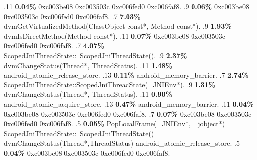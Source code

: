\begin{profile}
{.11 \textbf{0.04\%} 0xc003be08\newline {} 0xc003503c\newline {} 0xc006fed0\newline {} 0xc006faf8. 
.9 \textbf{0.06\%} 0xc003be08\newline {} 0xc003503c\newline {} 0xc006fed0\newline {} 0xc006faf8. 
.7 \textbf{7.03\%} dvmGetVirtualizedMethod(ClassObject const*, Method const*). 
.9 \textbf{1.93\%} dvmIsDirectMethod(Method const*). 
.11 \textbf{0.07\%} 0xc003be08\newline {} 0xc003503c\newline {} 0xc006fed0\newline {} 0xc006faf8. 
.7 \textbf{4.07\%} ScopedJniThreadState::~ScopedJniThreadState(). 
.9 \textbf{2.37\%} dvmChangeStatus(Thread*, ThreadStatus). 
.11 \textbf{1.48\%} android\_atomic\_release\_store. 
.13 \textbf{0.11\%} android\_memory\_barrier. 
.7 \textbf{2.74\%} ScopedJniThreadState::ScopedJniThreadState(\_JNIEnv*). 
.9 \textbf{1.31\%} dvmChangeStatus(Thread*, ThreadStatus). 
.11 \textbf{0.90\%} android\_atomic\_acquire\_store. 
.13 \textbf{0.47\%} android\_memory\_barrier. 
.11 \textbf{0.04\%} 0xc003be08\newline {} 0xc003503c\newline {} 0xc006fed0\newline {} 0xc006faf8. 
.7 \textbf{0.07\%} 0xc003be08\newline {} 0xc003503c\newline {} 0xc006fed0\newline {} 0xc006faf8. 
.5 \textbf{0.05\%} PopLocalFrame(\_JNIEnv*, \_jobject*)\newline {} ScopedJniThreadState::~ScopedJniThreadState()\newline {} dvmChangeStatus(Thread*,ThreadStatus)\newline {} android\_atomic\_release\_store. 
.5 \textbf{0.04\%} 0xc003be08\newline {} 0xc003503c\newline {} 0xc006fed0\newline {} 0xc006faf8. 
}
\end{profile}

